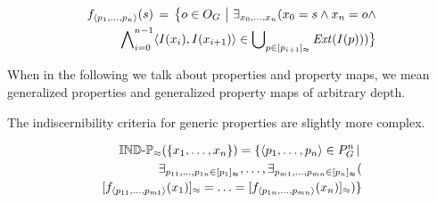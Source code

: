 \small
\begin{definition}
\begin{align}
\label{def:generalized_property_map}
  f_{\langle p_1,\ldots,p_n\rangle}(s)
\,=\,
  \big\{o \in O_G\,\,\big\vert\,\,
    \exists_{x_0,\ldots,x_n}(
      x_0 = s \land x_n = o \land\nonumber\\
      \bigwedge_{i=0}^{n-1}\nolimits
          \langle I(x_i),I(x_{i+1})\rangle
        \in
          \bigcup_{p \in [p_{i+1}]_{\approx}}\nolimits \mathit{Ext}(I(p))
    )
  \big\}\nonumber
\end{align}
\end{definition}
\normalsize

When in the following we talk about properties and property maps,
  we mean generalized properties and generalized property maps
  of arbitrary depth.

The indiscernibility criteria for generic properties
  are slightly more complex.

\small
\begin{definition}
\label{def:indiscernibility_criteria}
\begin{align}
  \indp_{\approx}(\set{\range{x_1}{x_n}})
=
  \setdef{
    \tuplerange{p_1}{p_n} \in P_G^n
  }{\\
      \exists_{\range{p_{11}}{p_{1n}} \in \equivset{p_1}},
    \ldots,
      \exists_{\range{p_{m1}}{p_{mn}} \in \equivset{p_n}}
    (\nonumber\\
        \equivset{f_{\tuplerange{p_{11}}{p_{m1}}} (x_1)}
      =
        \ldots
      =
        \equivset{f_{\tuplerange{p_{1n}}{p_{mn}}} (x_n)}
    )
  }\nonumber
\end{align}
\end{definition}
\normalsize

